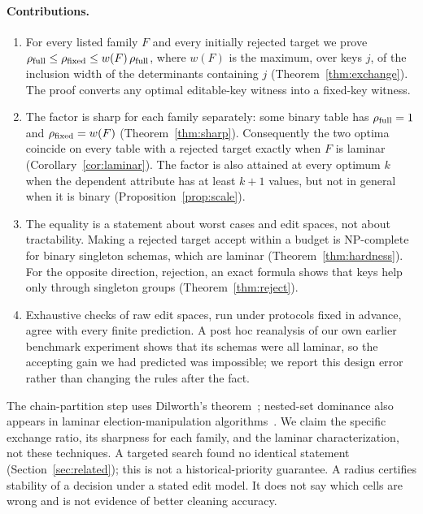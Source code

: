 \documentclass[11pt]{article}
\theoremstyle{remark}
\newcommand{\rfull}{\rho_{\rm full}}
\newcommand{\rfix}{\rho_{\rm fixed}}
\begin{document}
\paragraph{Contributions.}
\begin{enumerate}
\item For every listed family $F$ and every initially rejected target we prove
$\rfull\le\rfix\le w(F)\,\rfull$, where $w(F)$ is the maximum, over keys
$j$, of the inclusion width of the determinants containing $j$
(Theorem~\ref{thm:exchange}). The proof converts any optimal editable-key
witness into a fixed-key witness.
\item The factor is sharp for each family separately: some binary table has
$\rfull=1$ and $\rfix=w(F)$ (Theorem~\ref{thm:sharp}). Consequently the two
optima coincide on every table with a rejected target exactly when $F$ is laminar
(Corollary~\ref{cor:laminar}). The factor is also attained at every optimum
$k$ when the dependent attribute has at least $k+1$ values, but not in general
when it is binary (Proposition~\ref{prop:scale}).
\item The equality is a statement about worst cases and edit spaces, not about
tractability. Making a rejected target accept within a budget is NP-complete
for binary singleton schemas, which are laminar (Theorem~\ref{thm:hardness}).
For the opposite direction, rejection, an exact formula shows that keys help
only through singleton groups (Theorem~\ref{thm:reject}).
\item Exhaustive checks of raw edit spaces, run under protocols fixed in
advance, agree with every finite prediction. A post hoc reanalysis of our own
earlier benchmark experiment shows that its schemas were all laminar, so the
accepting gain we had predicted was impossible; we report this design error
rather than changing the rules after the fact.
\end{enumerate}

The chain-partition step uses Dilworth's theorem~\cite{dilworth}; nested-set
dominance also appears in laminar election-manipulation
algorithms~\cite{emmi2026}. We claim the specific exchange ratio, its sharpness
for each family, and the laminar characterization, not these techniques.
A targeted search found no identical statement (Section~\ref{sec:related});
this is not a historical-priority guarantee. A radius certifies stability of a
decision under a stated edit model. It does not say which cells are wrong and
is not evidence of better cleaning accuracy.
\end{document}

